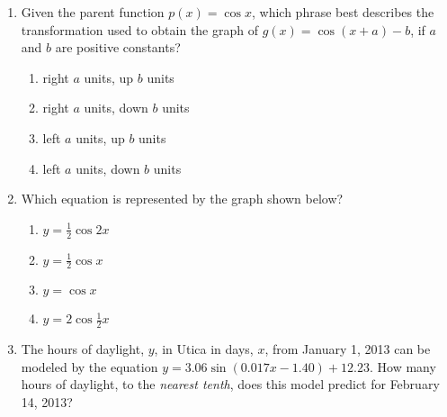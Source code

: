 \documentclass[12pt, oneside]{article}
\begin{document}
\begin{enumerate}
\item Given the parent function $p(x)=\cos x$, which phrase best describes the transformation used to obtain the graph of $g(x)=  \cos (x+a) - b$, if $a$ and $b$ are positive constants?
\begin{enumerate}
    \item right $a$ units, up $b$ units
    \item right $a$ units, down $b$ units
    \item left $a$ units, up $b$ units
    \item left $a$ units, down $b$ units
\end{enumerate}%

\item Which equation is represented by the graph shown below?
\begin{center}
\end{center}
\begin{enumerate}
    \item $y=\frac{1}{2} \cos 2x$
    \item $y=\frac{1}{2} \cos x$
    \item $y= \cos x$
    \item $y=2 \cos \frac{1}{2}x$
\end{enumerate} %


\item The hours of daylight, $y$, in Utica in days, $x$, from January 1, 2013 can be modeled by the equation $y = 3.06 \sin(0.017x-1.40) +12.23$. How many hours of daylight, to the \emph{nearest tenth}, does this model predict for February 14, 2013?


\end{enumerate}
\end{document}
